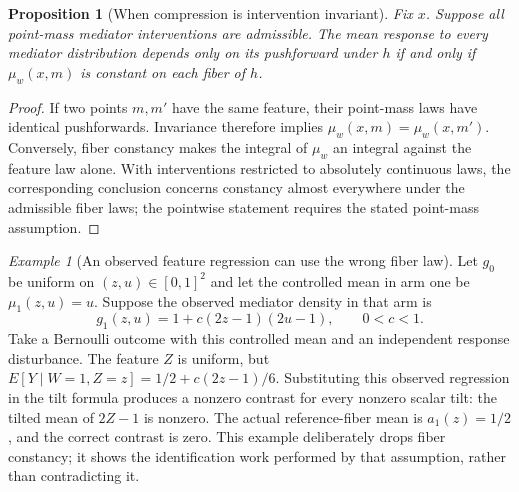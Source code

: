 \documentclass[11pt]{article}
\newtheorem{proposition}[theorem]{Proposition}
\theoremstyle{remark}
\newtheorem{example}[theorem]{Example}
\begin{document}
\begin{proposition}[When compression is intervention invariant]
Fix $x$. Suppose all point-mass mediator interventions are admissible. The mean response to every mediator distribution depends only on its pushforward under $h$ if and only if $\mu_w(x,m)$ is constant on each fiber of $h$.
\end{proposition}
\begin{proof}
If two points $m,m'$ have the same feature, their point-mass laws have identical pushforwards. Invariance therefore implies $\mu_w(x,m)=\mu_w(x,m')$. Conversely, fiber constancy makes the integral of $\mu_w$ an integral against the feature law alone. With interventions restricted to absolutely continuous laws, the corresponding conclusion concerns constancy almost everywhere under the admissible fiber laws; the pointwise statement requires the stated point-mass assumption.
\end{proof}

\begin{example}[An observed feature regression can use the wrong fiber law]
Let $g_0$ be uniform on $(z,u)\in[0,1]^2$ and let the controlled mean in arm one be $\mu_1(z,u)=u$. Suppose the observed mediator density in that arm is
\[
 g_1(z,u)=1+c(2z-1)(2u-1),\qquad 0<c<1.
\]
Take a Bernoulli outcome with this controlled mean and an independent response disturbance. The feature $Z$ is uniform, but
$E[Y\mid W=1,Z=z]=1/2+c(2z-1)/6$. Substituting this observed regression in the tilt formula produces a nonzero contrast for every nonzero scalar tilt: the tilted mean of $2Z-1$ is nonzero. The actual reference-fiber mean is $a_1(z)=1/2$, and the correct contrast is zero. This example deliberately drops fiber constancy; it shows the identification work performed by that assumption, rather than contradicting it.
\end{example}
\end{document}
